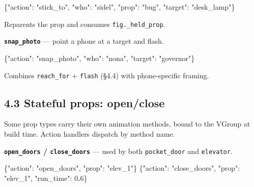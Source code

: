\documentclass[
  11pt,
]{book}
\newenvironment{Shaded}{}{}
\newcommand{\DataTypeTok}[1]{\textcolor[rgb]{0.56,0.13,0.00}{#1}}
\newcommand{\DecValTok}[1]{\textcolor[rgb]{0.25,0.63,0.44}{#1}}
\newcommand{\ErrorTok}[1]{\textcolor[rgb]{1.00,0.00,0.00}{\textbf{#1}}}
\newcommand{\FunctionTok}[1]{\textcolor[rgb]{0.02,0.16,0.49}{#1}}
\newcommand{\StringTok}[1]{\textcolor[rgb]{0.25,0.44,0.63}{#1}}
\begin{document}
\begin{Shaded}
\begin{Highlighting}[]
\FunctionTok{\{}\DataTypeTok{"action"}\FunctionTok{:} \StringTok{"stick\_to"}\FunctionTok{,} \DataTypeTok{"who"}\FunctionTok{:} \StringTok{"sidel"}\FunctionTok{,}
 \DataTypeTok{"prop"}\FunctionTok{:} \StringTok{"bug"}\FunctionTok{,} \DataTypeTok{"target"}\FunctionTok{:} \StringTok{"desk\_lamp"}\FunctionTok{\}}
\end{Highlighting}
\end{Shaded}

Reparents the prop and consumes \texttt{fig.\_held\_prop}.

\textbf{\texttt{snap\_photo}} --- point a phone at a target and flash.

\begin{Shaded}
\begin{Highlighting}[]
\FunctionTok{\{}\DataTypeTok{"action"}\FunctionTok{:} \StringTok{"snap\_photo"}\FunctionTok{,} \DataTypeTok{"who"}\FunctionTok{:} \StringTok{"nona"}\FunctionTok{,} \DataTypeTok{"target"}\FunctionTok{:} \StringTok{"governor"}\FunctionTok{\}}
\end{Highlighting}
\end{Shaded}

Combines \texttt{reach\_for} + \texttt{flash} (§4.4) with phone-specific
framing.

\subsection{4.3 Stateful props:
open/close}\label{stateful-props-openclose}

Some prop types carry their own animation methods, bound to the VGroup
at build time. Action handlers dispatch by method name.

\textbf{\texttt{open\_doors} / \texttt{close\_doors}} --- used by both
\texttt{pocket\_door} and \texttt{elevator}.

\begin{Shaded}
\begin{Highlighting}[]
\FunctionTok{\{}\DataTypeTok{"action"}\FunctionTok{:} \StringTok{"open\_doors"}\FunctionTok{,} \DataTypeTok{"prop"}\FunctionTok{:} \StringTok{"elev\_1"}\FunctionTok{\}}
\FunctionTok{\{}\DataTypeTok{"action"}\FunctionTok{:} \StringTok{"close\_doors"}\FunctionTok{,} \DataTypeTok{"prop"}\FunctionTok{:} \StringTok{"elev\_1"}\FunctionTok{,} \DataTypeTok{"run\_time"}\FunctionTok{:} \DecValTok{0}\ErrorTok{.}\DecValTok{6}\FunctionTok{\}}
\end{Highlighting}
\end{Shaded}
\end{document}
